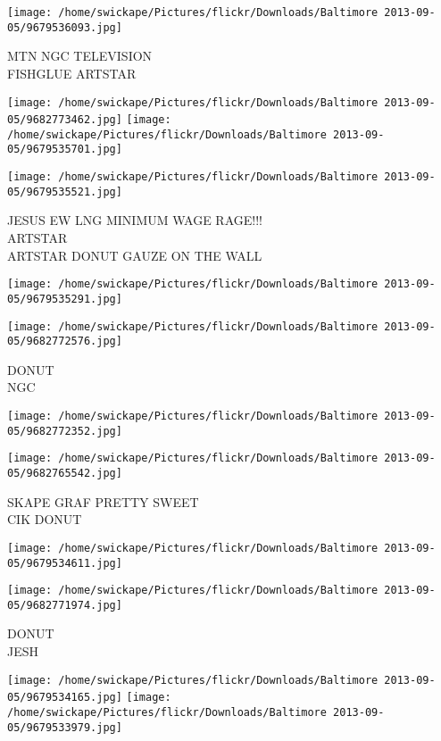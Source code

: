 \documentclass[10pt,letterpaper]{article}
\begin{document}
\vspace{0.25in}
\texttt{[image: /home/swickape/Pictures/flickr/Downloads/Baltimore 2013-09-05/9679536093.jpg]}

MTN NGC TELEVISION\\
FISHGLUE ARTSTAR
\pagebreak

\texttt{[image: /home/swickape/Pictures/flickr/Downloads/Baltimore 2013-09-05/9682773462.jpg]}
\texttt{[image: /home/swickape/Pictures/flickr/Downloads/Baltimore 2013-09-05/9679535701.jpg]}

\texttt{[image: /home/swickape/Pictures/flickr/Downloads/Baltimore 2013-09-05/9679535521.jpg]}

JESUS EW LNG MINIMUM WAGE RAGE!!!\\
ARTSTAR\\
ARTSTAR DONUT GAUZE ON THE WALL
\pagebreak

\texttt{[image: /home/swickape/Pictures/flickr/Downloads/Baltimore 2013-09-05/9679535291.jpg]}

\vspace{0.25in}
\texttt{[image: /home/swickape/Pictures/flickr/Downloads/Baltimore 2013-09-05/9682772576.jpg]}

DONUT\\
NGC
\pagebreak

\texttt{[image: /home/swickape/Pictures/flickr/Downloads/Baltimore 2013-09-05/9682772352.jpg]}

\vspace{0.25in}
\texttt{[image: /home/swickape/Pictures/flickr/Downloads/Baltimore 2013-09-05/9682765542.jpg]}

SKAPE GRAF PRETTY SWEET\\
CIK DONUT
\pagebreak

\texttt{[image: /home/swickape/Pictures/flickr/Downloads/Baltimore 2013-09-05/9679534611.jpg]}

\vspace{0.25in}
\texttt{[image: /home/swickape/Pictures/flickr/Downloads/Baltimore 2013-09-05/9682771974.jpg]}

DONUT\\
JESH
\pagebreak

\texttt{[image: /home/swickape/Pictures/flickr/Downloads/Baltimore 2013-09-05/9679534165.jpg]}
\texttt{[image: /home/swickape/Pictures/flickr/Downloads/Baltimore 2013-09-05/9679533979.jpg]}
\end{document}
